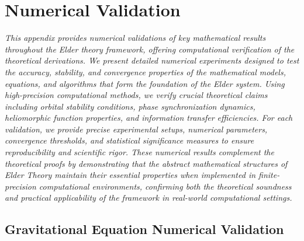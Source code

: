 \chapter{Numerical Validation}

\textit{This appendix provides numerical validations of key mathematical results throughout the Elder theory framework, offering computational verification of the theoretical derivations. We present detailed numerical experiments designed to test the accuracy, stability, and convergence properties of the mathematical models, equations, and algorithms that form the foundation of the Elder system. Using high-precision computational methods, we verify crucial theoretical claims including orbital stability conditions, phase synchronization dynamics, heliomorphic function properties, and information transfer efficiencies. For each validation, we provide precise experimental setups, numerical parameters, convergence thresholds, and statistical significance measures to ensure reproducibility and scientific rigor. These numerical results complement the theoretical proofs by demonstrating that the abstract mathematical structures of Elder Theory maintain their essential properties when implemented in finite-precision computational environments, confirming both the theoretical soundness and practical applicability of the framework in real-world computational settings.}

\section{Gravitational Equation Numerical Validation}

